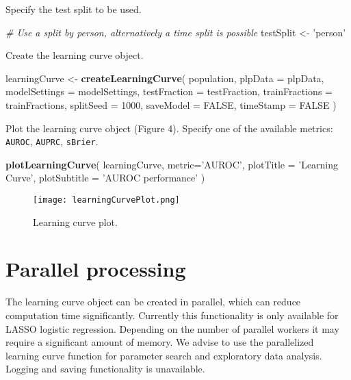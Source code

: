 \documentclass[]{article}
\newenvironment{Shaded}{\begin{snugshade}}{\end{snugshade}}
\newcommand{\KeywordTok}[1]{\textcolor[rgb]{0.13,0.29,0.53}{\textbf{#1}}}
\newcommand{\DataTypeTok}[1]{\textcolor[rgb]{0.13,0.29,0.53}{#1}}
\newcommand{\DecValTok}[1]{\textcolor[rgb]{0.00,0.00,0.81}{#1}}
\newcommand{\StringTok}[1]{\textcolor[rgb]{0.31,0.60,0.02}{#1}}
\newcommand{\CommentTok}[1]{\textcolor[rgb]{0.56,0.35,0.01}{\textit{#1}}}
\newcommand{\OtherTok}[1]{\textcolor[rgb]{0.56,0.35,0.01}{#1}}
\newcommand{\NormalTok}[1]{#1}
\begin{document}
Specify the test split to be used.

\begin{Shaded}
\begin{Highlighting}[]
\CommentTok{# Use a split by person, alternatively a time split is possible}
\NormalTok{testSplit <-}\StringTok{ 'person'}
\end{Highlighting}
\end{Shaded}

Create the learning curve object.

\begin{Shaded}
\begin{Highlighting}[]
\NormalTok{learningCurve <-}\StringTok{ }\KeywordTok{createLearningCurve}\NormalTok{(}
\NormalTok{  population,}
  \DataTypeTok{plpData =}\NormalTok{ plpData,}
  \DataTypeTok{modelSettings =}\NormalTok{ modelSettings,}
  \DataTypeTok{testFraction =}\NormalTok{ testFraction,}
  \DataTypeTok{trainFractions =}\NormalTok{ trainFractions,}
  \DataTypeTok{splitSeed =} \DecValTok{1000}\NormalTok{,}
  \DataTypeTok{saveModel =} \OtherTok{FALSE}\NormalTok{,}
  \DataTypeTok{timeStamp =} \OtherTok{FALSE}
\NormalTok{)}
\end{Highlighting}
\end{Shaded}

Plot the learning curve object (Figure 4). Specify one of the available
metrics: \texttt{AUROC}, \texttt{AUPRC}, \texttt{sBrier}.

\begin{Shaded}
\begin{Highlighting}[]
\KeywordTok{plotLearningCurve}\NormalTok{(}
\NormalTok{  learningCurve,}
  \DataTypeTok{metric=}\StringTok{'AUROC'}\NormalTok{,}
  \DataTypeTok{plotTitle =} \StringTok{'Learning Curve'}\NormalTok{,}
  \DataTypeTok{plotSubtitle =} \StringTok{'AUROC performance'}
\NormalTok{)}
\end{Highlighting}
\end{Shaded}

\begin{figure}
\centering
\texttt{[image: learningCurvePlot.png]}
\caption{Learning curve plot.}
\end{figure}

\section{Parallel processing}\label{parallel-processing}

The learning curve object can be created in parallel, which can reduce
computation time significantly. Currently this functionality is only
available for LASSO logistic regression. Depending on the number of
parallel workers it may require a significant amount of memory. We
advise to use the parallelized learning curve function for parameter
search and exploratory data analysis. Logging and saving functionality
is unavailable.
\end{document}
